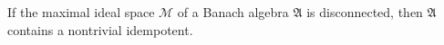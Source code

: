 
If the maximal ideal space $\mathcal{M}$ of a Banach algebra $\mathfrak{A}$ is disconnected, then $\mathfrak{A}$ contains a nontrivial idempotent.

